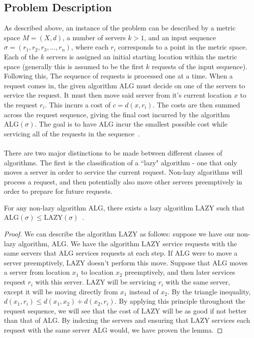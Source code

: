 \subsection{Problem Description}
\label{sec:desc}
As described above, an instance of the \KS problem can be described by a metric space $M = (X, d)$, a number of servers $k>1$, and an input sequence $\sigma = (r_1, r_2, r_3, ..., r_n)$, where each $r_i$ corresponds to a point in the metric space. Each of the $k$ servers is assigned an initial starting location within the metric space (generally this is assumed to be the first $k$ requests of the input sequence). Following this, The sequence of requests is processed one at a time. When a request comes in, the given algorithm $\mathrm{ALG}$ must decide on one of the servers to service the request. It must then move said server from it's current location $x$ to the request $r_i$. This incurs a cost of $c = d(x, r_i)$. The costs are then summed across the request sequence, giving the final cost incurred by the algorithm $\mathrm{ALG}(\sigma)$. The goal is to have $\mathrm{ALG}$ incur the smallest possible cost while servicing all of the requests in the sequence~\cite{OnlineComp1998}.
\\ \\
There are two major distinctions to be made between different classes of algorithms. The first is the classification of a ``lazy" algorithm - one that only moves a server in order to service the current request. Non-lazy algorithms will process a request, and then potentially also move other servers preemptively in order to prepare for future requests. 

\begin{lemma}
    For any non-lazy algorithm $\mathrm{ALG}$, there exists a lazy algorithm $\mathrm{LAZY}$ such that $\mathrm{ALG}(\sigma) \leq \mathrm{LAZY}(\sigma)$~\cite{OnlineComp1998}.
\end{lemma}

\begin{proof}
    We can describe the algorithm $\mathrm{LAZY}$ as follows: suppose we have our non-lazy algorithm, $\mathrm{ALG}$. We have the algorithm $\mathrm{LAZY}$ service requests with the same servers that $\mathrm{ALG}$ services requests at each step. If $\mathrm{ALG}$ were to move a server preemptively, $\mathrm{LAZY}$ doesn't perform this move. Suppose that $\mathrm{ALG}$ moves a server from location $x_1$ to location $x_2$ preemptively, and then later services request $r_i$ with this server. $\mathrm{LAZY}$ will be servicing $r_i$ with the same server, except it will be moving directly from $x_1$ instead of $x_2$. By the triangle inequality, $d(x_1, r_i) \leq d(x_1, x_2) + d(x_2, r_i)$. By applying this principle throughout the request sequence, we will see that the cost of $\mathrm{LAZY}$ will be as good if not better than that of $\mathrm{ALG}$. By indexing the servers and ensuring that $\mathrm{LAZY}$ services each request with the same server $\mathrm{ALG}$ would, we have proven the lemma.
\end{proof}

